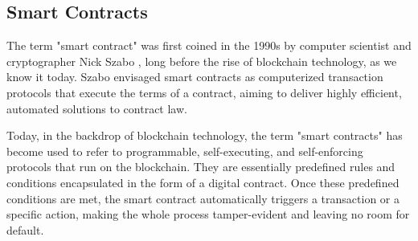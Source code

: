 \subsection{Smart Contracts}
\label{sec:smart_contracts}
The term "smart contract" was first coined in the 1990s by computer scientist and cryptographer Nick Szabo \citep{szabo1997formalizing}, long before the rise of blockchain technology, as we know it today. Szabo envisaged smart contracts as computerized transaction protocols that execute the terms of a contract, aiming to deliver highly efficient, automated solutions to contract law.

Today, in the backdrop of blockchain technology, the term "smart contracts" has become used to refer to programmable, self-executing, and self-enforcing protocols that run on the blockchain. They are essentially predefined rules and conditions encapsulated in the form of a digital contract. Once these predefined conditions are met, the smart contract automatically triggers a transaction or a specific action, making the whole process tamper-evident and leaving no room for default.